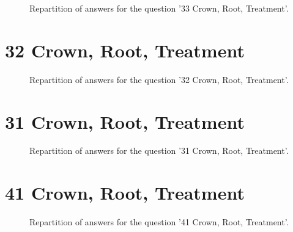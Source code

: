 \documentclass[12pt]{article}
\begin{document}
\label{sec:51}


\begin{figure}[h!]
    \caption{\label{figure:q51-1}Repartition of answers for the question '33
Crown, Root, Treatment'.}
\end{figure}



\clearpage{}
\section{32
Crown, Root, Treatment}

\label{sec:50}


\begin{figure}[h!]
    \caption{\label{figure:q50-1}Repartition of answers for the question '32
Crown, Root, Treatment'.}
\end{figure}



\clearpage{}
\section{31
Crown, Root, Treatment}

\label{sec:49}


\begin{figure}[h!]
    \caption{\label{figure:q49-1}Repartition of answers for the question '31
Crown, Root, Treatment'.}
\end{figure}



\clearpage{}
\section{41
Crown, Root, Treatment}

\label{sec:48}


\begin{figure}[h!]
    \caption{\label{figure:q48-1}Repartition of answers for the question '41
Crown, Root, Treatment'.}
\end{figure}
\end{document}
